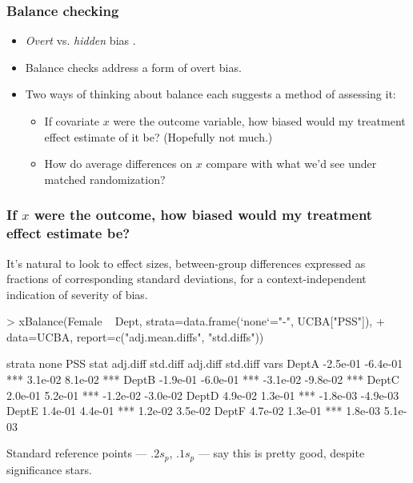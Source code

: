 
\begin{frame}
  \frametitle{Balance checking}
\begin{itemize}
\item \textit{Overt} vs. \textit{hidden} bias \citep{rosenbaum:2002}.
\item Balance checks address a form of overt bias.
\item Two ways of thinking about balance each suggests a method of assessing it:
  \begin{itemize}
  \item If covariate $x$ were the outcome variable, how biased would my treatment effect estimate of it be? (Hopefully not much.)
  \item How do average differences on $x$ compare with what we'd see under matched randomization?
  \end{itemize}
\end{itemize}
\end{frame}

\begin{frame}[fragile]
  \frametitle{If $x$ were the outcome, how biased would my treatment effect estimate be?}

  It's natural to look to effect sizes, between-group differences
  expressed as fractions of corresponding standard deviations, for a
  context-independent indication of severity of bias.
  
  
\begin{Schunk}
\begin{Sinput}
> xBalance(Female ~ Dept, strata=data.frame(`none`="-", UCBA["PSS"]), 
+ data=UCBA, report=c("adj.mean.diffs", "std.diffs"))
\end{Sinput}
\begin{Soutput}
      strata     none                        PSS                  
      stat   adj.diff std.diff          adj.diff std.diff         
vars                                                              
DeptA        -2.5e-01 -6.4e-01 ***      3.1e-02  8.1e-02  ***     
DeptB        -1.9e-01 -6.0e-01 ***      -3.1e-02 -9.8e-02 ***     
DeptC        2.0e-01  5.2e-01  ***      -1.2e-02 -3.0e-02         
DeptD        4.9e-02  1.3e-01  ***      -1.8e-03 -4.9e-03         
DeptE        1.4e-01  4.4e-01  ***      1.2e-02  3.5e-02          
DeptF        4.7e-02  1.3e-01  ***      1.8e-03  5.1e-03          
\end{Soutput}
\end{Schunk}

Standard reference points --- $.2s_{p}$, $.1s_{p}$ --- say this is
pretty good, despite significance stars.
\end{frame}

